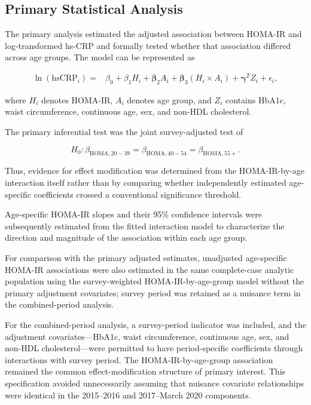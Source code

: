 \documentclass[11pt]{article}
\begin{document}
\subsection{Primary Statistical Analysis}

The primary analysis estimated the adjusted association between HOMA-IR
and log-transformed hs-CRP and formally tested whether that association
differed across age groups. The model can be represented as

\[
\begin{aligned}
\ln(\mathrm{hsCRP}_i)
={}&
\beta_0
+\beta_1 H_i
+\boldsymbol{\beta}_2 A_i
+\boldsymbol{\beta}_3(H_i\times A_i)
+\boldsymbol{\gamma}^{T}Z_i
+\epsilon_i,
\end{aligned}
\]

where $H_i$ denotes HOMA-IR, $A_i$ denotes age group, and $Z_i$ contains
HbA1c, waist circumference, continuous age, sex, and non-HDL cholesterol.

The primary inferential test was the joint survey-adjusted test of

\[
H_0:
\beta_{\mathrm{HOMA},20-39}
=
\beta_{\mathrm{HOMA},40-54}
=
\beta_{\mathrm{HOMA},55+}.
\]

Thus, evidence for effect modification was determined from the
HOMA-IR-by-age interaction itself rather than by comparing whether
independently estimated age-specific coefficients crossed a conventional
significance threshold.

Age-specific HOMA-IR slopes and their 95\% confidence intervals were
subsequently estimated from the fitted interaction model to characterize
the direction and magnitude of the association within each age group.

For comparison with the primary adjusted estimates, unadjusted
age-specific HOMA-IR associations were also estimated in the same
complete-case analytic population using the survey-weighted
HOMA-IR-by-age-group model without the primary adjustment covariates;
survey period was retained as a nuisance term in the combined-period
analysis.

For the combined-period analysis, a survey-period indicator was included,
and the adjustment covariates---HbA1c, waist circumference, continuous age,
sex, and non-HDL cholesterol---were permitted to have period-specific
coefficients through interactions with survey period. The
HOMA-IR-by-age-group association remained the common effect-modification
structure of primary interest. This specification avoided unnecessarily
assuming that nuisance covariate relationships were identical in the
2015--2016 and 2017--March 2020 components.
\end{document}
